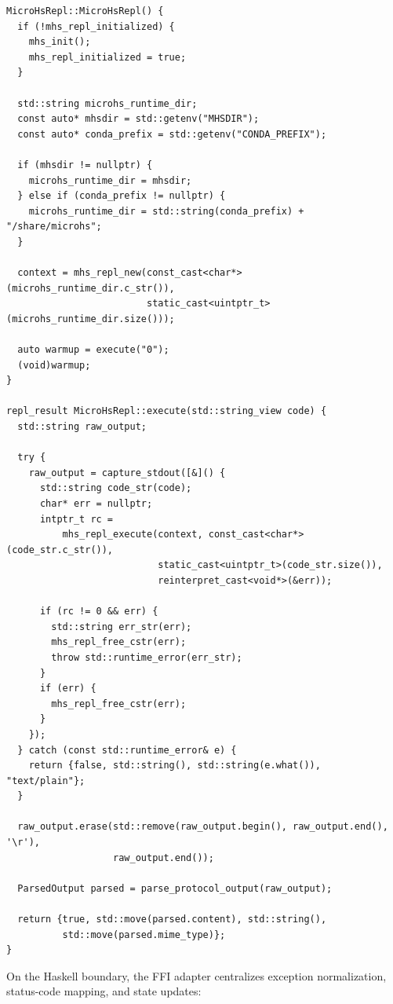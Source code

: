 \begin{verbatim}
MicroHsRepl::MicroHsRepl() {
  if (!mhs_repl_initialized) {
    mhs_init();
    mhs_repl_initialized = true;
  }

  std::string microhs_runtime_dir;
  const auto* mhsdir = std::getenv("MHSDIR");
  const auto* conda_prefix = std::getenv("CONDA_PREFIX");

  if (mhsdir != nullptr) {
    microhs_runtime_dir = mhsdir;
  } else if (conda_prefix != nullptr) {
    microhs_runtime_dir = std::string(conda_prefix) + "/share/microhs";
  }

  context = mhs_repl_new(const_cast<char*>(microhs_runtime_dir.c_str()),
                         static_cast<uintptr_t>(microhs_runtime_dir.size()));

  auto warmup = execute("0");
  (void)warmup;
}

repl_result MicroHsRepl::execute(std::string_view code) {
  std::string raw_output;

  try {
    raw_output = capture_stdout([&]() {
      std::string code_str(code);
      char* err = nullptr;
      intptr_t rc =
          mhs_repl_execute(context, const_cast<char*>(code_str.c_str()),
                           static_cast<uintptr_t>(code_str.size()),
                           reinterpret_cast<void*>(&err));

      if (rc != 0 && err) {
        std::string err_str(err);
        mhs_repl_free_cstr(err);
        throw std::runtime_error(err_str);
      }
      if (err) {
        mhs_repl_free_cstr(err);
      }
    });
  } catch (const std::runtime_error& e) {
    return {false, std::string(), std::string(e.what()), "text/plain"};
  }

  raw_output.erase(std::remove(raw_output.begin(), raw_output.end(), '\r'),
                   raw_output.end());

  ParsedOutput parsed = parse_protocol_output(raw_output);

  return {true, std::move(parsed.content), std::string(),
          std::move(parsed.mime_type)};
}
\end{verbatim}

On the Haskell boundary, the FFI adapter centralizes exception normalization, status-code mapping, and state updates:

